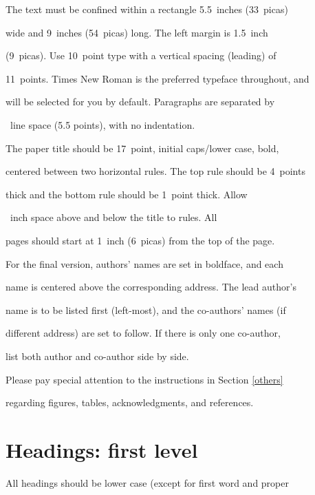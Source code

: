 \documentclass{article}
\begin{document}
\label{gen_inst}



The text must be confined within a rectangle 5.5~inches (33~picas)

wide and 9~inches (54~picas) long. The left margin is 1.5~inch

(9~picas).  Use 10~point type with a vertical spacing (leading) of

11~points.  Times New Roman is the preferred typeface throughout, and

will be selected for you by default.  Paragraphs are separated by

~line space (5.5 points), with no indentation.



The paper title should be 17~point, initial caps/lower case, bold,

centered between two horizontal rules. The top rule should be 4~points

thick and the bottom rule should be 1~point thick. Allow

~inch space above and below the title to rules. All

pages should start at 1~inch (6~picas) from the top of the page.



For the final version, authors' names are set in boldface, and each

name is centered above the corresponding address. The lead author's

name is to be listed first (left-most), and the co-authors' names (if

different address) are set to follow. If there is only one co-author,

list both author and co-author side by side.



Please pay special attention to the instructions in Section \ref{others}

regarding figures, tables, acknowledgments, and references.



\section{Headings: first level}

\label{headings}



All headings should be lower case (except for first word and proper
\end{document}
